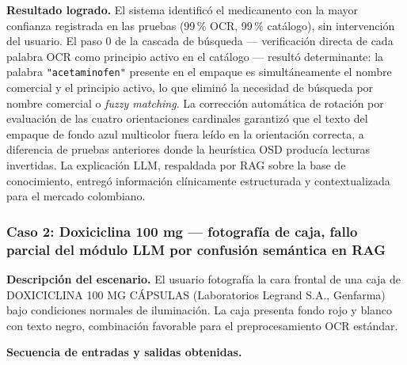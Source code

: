     \textbf{Resultado logrado.}
El sistema identificó el medicamento con la mayor confianza registrada en las pruebas (99\,\% OCR, 99\,\% catálogo), sin intervención del usuario. El paso 0 de la cascada de búsqueda --- verificación directa de cada palabra OCR como principio activo en el catálogo --- resultó determinante: la palabra \texttt{"acetaminofen"} presente en el empaque es simultáneamente el nombre comercial y el principio activo, lo que eliminó la necesidad de búsqueda por nombre comercial o \textit{fuzzy matching}. La corrección automática de rotación por evaluación de las cuatro orientaciones cardinales garantizó que el texto del empaque de fondo azul multicolor fuera leído en la orientación correcta, a diferencia de pruebas anteriores donde la heurística OSD producía lecturas invertidas. La explicación LLM, respaldada por RAG sobre la base de conocimiento, entregó información clínicamente estructurada y contextualizada para el mercado colombiano.

\subsubsection*{Caso 2: Doxiciclina 100 mg --- fotografía de caja, fallo parcial del módulo LLM por confusión semántica en RAG}

\textbf{Descripción del escenario.}
El usuario fotografía la cara frontal de una caja de DOXICICLINA 100 MG CÁPSULAS (Laboratorios Legrand S.A., Genfarma) bajo condiciones normales de iluminación. La caja presenta fondo rojo y blanco con texto negro, combinación favorable para el preprocesamiento OCR estándar.

\textbf{Secuencia de entradas y salidas obtenidas.}

